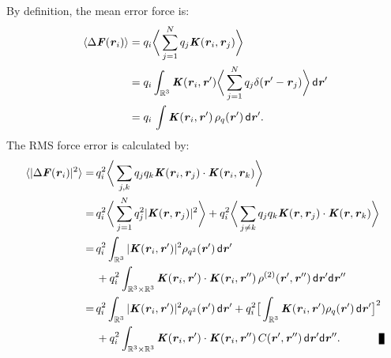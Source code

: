 \documentclass[aps,pre,preprint,unsortedaddress]{revtex4}
\renewcommand{\v}[1]{\textbf{\textit{#1}}}
\renewcommand{\d}[1]{\textsf{#1}}
\newenvironment{proof}[1][Proof]{\begin{trivlist}
\item[\hskip \labelsep {\bfseries #1}]}{\end{trivlist}}
\newcommand{\qed}{\nobreak \ifvmode \relax \else
      \ifdim\lastskip<1.5em \hskip-\lastskip
      \hskip1.5em plus0em minus0.5em \fi \nobreak
      \vrule height0.75em width0.5em depth0.25em\fi}
\begin{document}
\begin{proof}
  By definition, the mean error force is:
  \begin{align*}
    \langle\Delta\v F(\v r_i)\rangle
    &=
    q_i\bigg\langle \sum_{j=1}^Nq_j\v K(\v r_i,\v r_j)\bigg\rangle\\
    &=
    q_i\int_{\mathbb R^3}\v K(\v r_i, \v r')
    \bigg\langle \sum_{j=1}^Nq_j\delta (\v r' -\v r_j)\bigg\rangle
    \,\d d\v r'\\
    &= 
    q_i\,\int\v K(\v r_i,\v r')\,\rho_q(\v r')\,\d d\v r'.
  \end{align*}
  The RMS force error is calculated by:
  \begin{align} \nonumber
    \langle\vert\Delta\v F(\v r_i)\vert^2\rangle
    =\,&
    q_i^2\bigg\langle\sum_{j,k}
    q_jq_k\v K(\v r_i, \v r_j)\cdot\v K(\v r_i, \v r_k)\bigg\rangle \\ \nonumber
    =\,&
    q_i^2\bigg\langle\sum_{j=1}^N
    q_j^2\vert\v K(\v r, \v r_j)\vert^2
    \bigg\rangle +
    q_i^2\bigg\langle\sum_{j\neq k}
    q_jq_k \v K(\v r, \v r_j)\cdot\v K(\v r, \v r_k)
    \bigg\rangle \\ \nonumber
    =\,&
    q_i^2\int_{\mathbb R^3}
    \vert\v K(\v r_i, \v r')\vert^2\rho_{q^2}(\v r')\,\d d\v r'
    \\\label{eqn:prf-error-step3}
    & +
    q_i^2\int_{\mathbb R^3\times\mathbb R^3}
    \v K(\v r_i , \v r')\cdot\v K(\v r_i , \v r'')\,
    \rho^{(2)}(\v r', \v r'')
    \,\d d\v r'\d d\v r''\\\nonumber
    =\,&
    q_i^2\int_{\mathbb R^3}
    \vert\v K(\v r_i , \v r')\vert^2\rho_{q^2}(\v r')\,\d d\v r'
    +
    q_i^2
    \big[
    \int_{\mathbb R^3}
    \v K(\v r_i , \v r')\rho_{q}(\v r')\,\d d\v r'
    \big]^2
    \\ \nonumber
    & +
    q_i^2\int_{\mathbb R^3\times\mathbb R^3}
    \v K(\v r_i , \v r')\cdot\v K(\v r_i , \v r'')\,
    C(\v r', \v r'')
    \,\d d\v r'\d d\v r''.\qquad\qed
  \end{align}
\end{proof}
\end{document}
